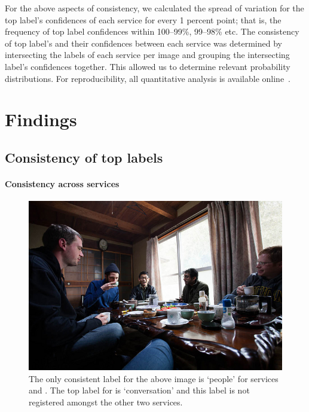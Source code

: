 For the above aspects of consistency, we calculated the spread of variation for the top label's confidences of each service for every 1 percent point; that is, the frequency of top label confidences within 100--99\%, 99--98\% etc. The consistency of top label's and their confidences between each service was determined by intersecting the labels of each service per image and grouping the intersecting label's confidences together. This allowed us to determine relevant probability distributions. For reproducibility, all quantitative analysis is available online~. 

\section{Findings}
\label{icsme2019:sec:findings}

\subsection{Consistency of top labels}
\label{icsme2019:ssec:findings:consistency-of-labels}

\paragraph{Consistency across services}

\begin{figure}[t]
  \centering
  \includegraphics[width=0.5\linewidth]{000000009590}    
  \caption[Consistency of labels in CV services is rare]{The only consistent label for the above image is `people' for services \awsapi{} and \azureapi{}. The top label for \googleapi{} is `conversation' and this label is not registered amongst the other two services.}
  \label{icsme2019:fig:sample-images:people}
\end{figure}

